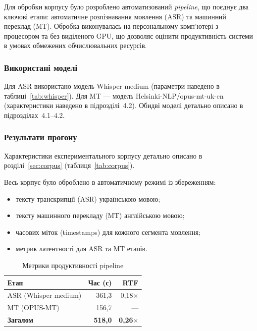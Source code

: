 Для обробки корпусу було розроблено автоматизований \textit{pipeline}, що
поєднує два ключові етапи: автоматичне розпізнавання мовлення (ASR) та
машинний переклад (MT). Обробка виконувалась на персональному комп'ютері
з процесором та без виділеного GPU, що дозволяє оцінити продуктивність
системи в умовах обмежених обчислювальних ресурсів.

\subsubsection{Використані моделі}

Для ASR використано модель Whisper medium (параметри наведено в
таблиці~\ref{tab:whisper}). Для MT --- модель
Helsinki-NLP/opus-mt-uk-en (характеристики наведено в
підрозділі~4.2). Обидві моделі детально описано
в підрозділах~4.1--4.2.

\subsubsection{Результати прогону}

Характеристики експериментального корпусу детально описано в розділі~\ref{sec:corpus}
(таблиця~\ref{tab:corpus}).

Весь корпус було оброблено в автоматичному режимі із збереженням:
\begin{itemize}
    \item тексту транскрипції (ASR) українською мовою;
    \item тексту машинного перекладу (MT) англійською мовою;
    \item часових міток (timestamps) для кожного сегмента мовлення;
    \item метрик латентності для ASR та MT етапів.
\end{itemize}

\begin{table}[H]
\centering
\caption{Метрики продуктивності pipeline}
\label{tab:latency}
\begin{tabular}{|l|r|r|}
\hline
\textbf{Етап} & \textbf{Час (с)} & \textbf{RTF} \\
\hline
ASR (Whisper medium) & 361,3 & 0,18$\times$ \\
MT (OPUS-MT) & 156,7 & --- \\
\hline
\textbf{Загалом} & \textbf{518,0} & \textbf{0,26$\times$} \\
\hline
\end{tabular}
\end{table}

